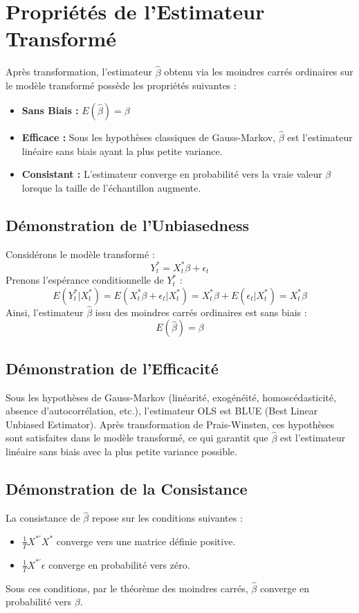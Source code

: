 \documentclass[14pt]{extarticle} %
\theoremstyle{definition}
\theoremstyle{plain}
\begin{document}
\section{Propriétés de l'Estimateur Transformé}
Après transformation, l'estimateur \( \hat{\beta} \) obtenu via les moindres carrés ordinaires sur le modèle transformé possède les propriétés suivantes :
\begin{itemize}
    \item \textbf{Sans Biais :} \( E(\hat{\beta}) = \beta \)
    \item \textbf{Efficace :} Sous les hypothèses classiques de Gauss-Markov, \( \hat{\beta} \) est l'estimateur linéaire sans biais ayant la plus petite variance.
    \item \textbf{Consistant :} L'estimateur converge en probabilité vers la vraie valeur \( \beta \) lorsque la taille de l'échantillon augmente.
\end{itemize}

\subsection{Démonstration de l'Unbiasedness}
Considérons le modèle transformé :
\[
Y_t^* = X_t^* \beta + \epsilon_t
\]
Prenons l'espérance conditionnelle de \( Y_t^* \) :
\[
E(Y_t^* | X_t^*) = E(X_t^* \beta + \epsilon_t | X_t^*) = X_t^* \beta + E(\epsilon_t | X_t^*) = X_t^* \beta
\]
Ainsi, l'estimateur \( \hat{\beta} \) issu des moindres carrés ordinaires est sans biais :
\[
E(\hat{\beta}) = \beta
\]

\subsection{Démonstration de l'Efficacité}
Sous les hypothèses de Gauss-Markov (linéarité, exogénéité, homoscédasticité, absence d'autocorrélation, etc.), l'estimateur OLS est BLUE (Best Linear Unbiased Estimator). Après transformation de Prais-Winsten, ces hypothèses sont satisfaites dans le modèle transformé, ce qui garantit que \( \hat{\beta} \) est l'estimateur linéaire sans biais avec la plus petite variance possible.

\subsection{Démonstration de la Consistance}
La consistance de \( \hat{\beta} \) repose sur les conditions suivantes :
\begin{itemize}
    \item \( \frac{1}{T} X^{*'} X^* \) converge vers une matrice définie positive.
    \item \( \frac{1}{T} X^{*'} \epsilon \) converge en probabilité vers zéro.
\end{itemize}
Sous ces conditions, par le théorème des moindres carrés, \( \hat{\beta} \) converge en probabilité vers \( \beta \).
\end{document}
